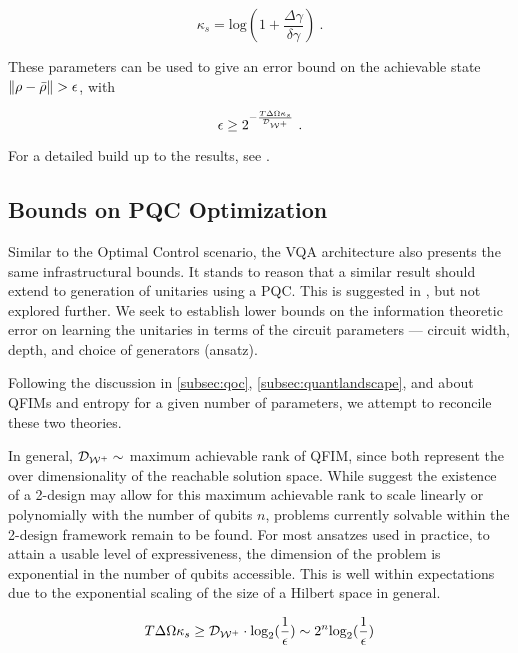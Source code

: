 \begin{equation}
    \kappa_s = \text{log}(1+\frac{\Delta\gamma}{\delta\gamma})~.
\end{equation}

These parameters can be used to give an error bound on the achievable state
\(\norm{\rho - \bar{\rho}} > \epsilon\), with

\begin{equation}
    \epsilon \geq 2^{-\frac{T\Delta\Omega\kappa_s}{\mathcal{D}_{\mathcal{W^+}}}}~.
    \label{eq:entropyerror}
\end{equation}

For a detailed build up to the results, see \cite{lloyd2014information}.

\subsection{Bounds on PQC Optimization}

Similar to the Optimal Control scenario, the VQA architecture also presents the
same infrastructural bounds. It stands to reason that a similar result should
extend to generation of unitaries using a PQC. This is suggested in
\cite[Supplemental Material]{lloyd2014information}, but not explored further. We
seek to establish lower bounds on the information theoretic error on learning
the unitaries in terms of the circuit parameters --- circuit width, depth, and
choice of generators (ansatz).

Following the discussion in \autoref{subsec:qoc},
\autoref{subsec:quantlandscape}, and \cite{larocca2021theory} about QFIMs and
entropy for a given number of parameters, we attempt to reconcile these two
theories. 

In general, \(\mathcal{D}_{\mathcal{W^+}} \sim \) maximum achievable rank of QFIM,
since both represent the over dimensionality of the reachable solution space.
While \cite{larocca2021theory,holmes2021connecting} suggest the existence of a
2-design may allow for this maximum achievable rank to scale linearly or
polynomially with the number of qubits \(n\), problems currently solvable within
the 2-design framework remain to be found. For most ansatzes used in practice,
to attain a usable level of expressiveness, the dimension of the problem is
exponential in the number of qubits accessible. This is well within expectations
due to the exponential scaling of the size of a Hilbert space in general.

\begin{equation}
    T\Delta\Omega\kappa_s \geq \mathcal{D}_{\mathcal{W^+}} \cdot \text{log}_2(\frac{1}{\epsilon}) \sim 2^n \text{log}_2(\frac{1}{\epsilon})
\end{equation}

